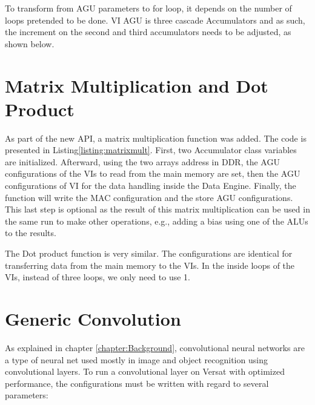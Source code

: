 

To transform from AGU parameters to for loop, it depends on the number of loops pretended to be done. VI AGU is three  cascade Accumulators
and as such, the increment on the second and third accumulators needs to be adjusted, as shown below.



\section{Matrix Multiplication and Dot Product}

As part of the new API, a matrix multiplication function was added. The code is presented in Listing\ref{listing:matrixmult}. First, two Accumulator class variables are initialized.
Afterward, using the two arrays address in DDR, the AGU configurations of the VIs to read from the main memory are set, then the AGU configurations of VI for the data handling inside the Data Engine.
Finally, the function will write the MAC configuration and the store AGU configurations. This last step is optional as the result of this matrix multiplication can be used in the same run
to make other operations, e.g., adding a bias using one of the ALUs to the results.



The Dot product function is very similar. The configurations are identical for transferring data from the main memory to the VIs. In the inside loops of the VIs, instead of three  loops, we only need to use 
1.

\section{Generic Convolution}

As explained in chapter \ref*{chapter:Background}, convolutional neural networks are a type of neural net  
used mostly in image and object recognition using convolutional layers. To run a convolutional layer on Versat with
optimized performance, the configurations must be written with regard to several parameters:

